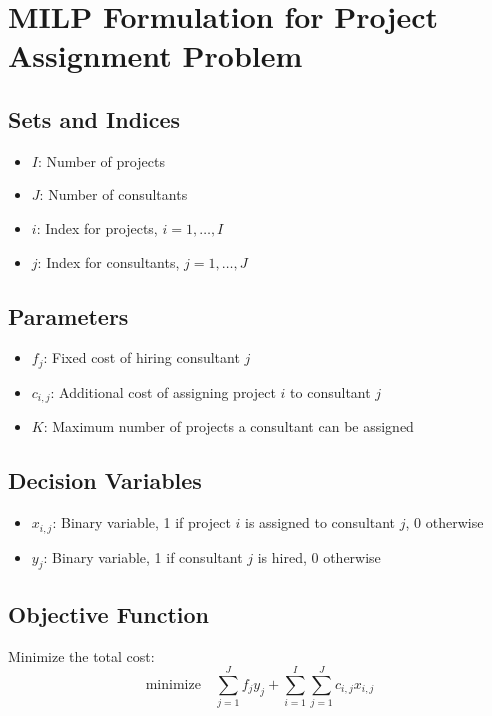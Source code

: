 \documentclass{article}
\begin{document}
\section*{MILP Formulation for Project Assignment Problem}

\subsection*{Sets and Indices}
\begin{itemize}
    \item \( I \): Number of projects
    \item \( J \): Number of consultants
    \item \( i \): Index for projects, \( i = 1, \ldots, I \)
    \item \( j \): Index for consultants, \( j = 1, \ldots, J \)
\end{itemize}

\subsection*{Parameters}
\begin{itemize}
    \item \( f_j \): Fixed cost of hiring consultant \( j \)
    \item \( c_{i,j} \): Additional cost of assigning project \( i \) to consultant \( j \)
    \item \( K \): Maximum number of projects a consultant can be assigned
\end{itemize}

\subsection*{Decision Variables}
\begin{itemize}
    \item \( x_{i,j} \): Binary variable, 1 if project \( i \) is assigned to consultant \( j \), 0 otherwise
    \item \( y_j \): Binary variable, 1 if consultant \( j \) is hired, 0 otherwise
\end{itemize}

\subsection*{Objective Function}
Minimize the total cost:
\[
\text{minimize} \quad \sum_{j=1}^{J} f_j y_j + \sum_{i=1}^{I} \sum_{j=1}^{J} c_{i,j} x_{i,j}
\]
\end{document}
